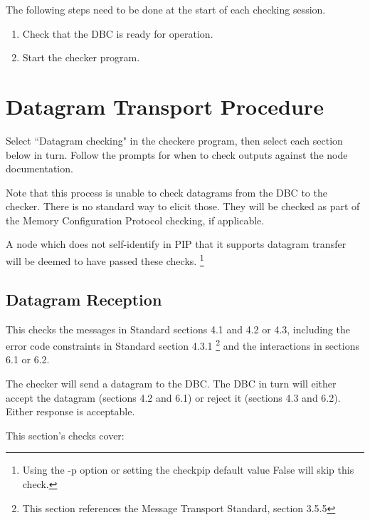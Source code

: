 \documentclass[11pt]{article}
\begin{document}
The following steps need to be done at the start of each checking session.
\begin{enumerate}
\item Check that the DBC is ready for operation.
\item Start the checker program.
\end{enumerate}

\section{Datagram Transport Procedure}

Select ``Datagram checking" in the checkere program, 
then select each section below in turn.  Follow the prompts
for when to check outputs against the node documentation.

Note that this process is unable to check datagrams from the DBC to the checker.
There is no standard way to elicit those.  They will be checked as part of the 
Memory Configuration Protocol checking, if applicable.

A node which does not self-identify in PIP that it supports
datagram transfer will be deemed to have passed these checks.
\footnote{Using the -p option or setting the checkpip default value False will skip this check.}

\subsection{Datagram Reception}

This checks the messages in Standard sections 4.1 and 4.2 or 4.3, 
including the error code constraints in Standard section 4.3.1
\footnote{This section references the Message Transport Standard, 
section 3.5.5}
and the interactions in sections 6.1 or 6.2.

The checker will send a datagram to the DBC. The DBC in turn will 
either accept the datagram (sections 4.2 and 6.1) or 
reject it (sections 4.3 and 6.2). Either response is acceptable.

This section's checks cover:
\end{document}
